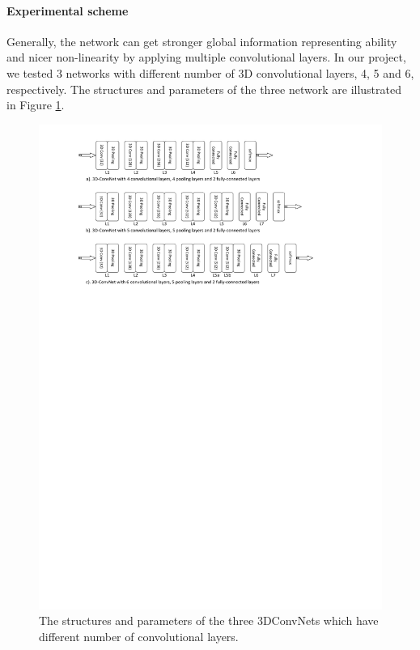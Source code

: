 \paragraph{Experimental scheme}
Generally, the network can get stronger global information representing ability and nicer non-linearity by applying multiple convolutional layers. In our project, we tested 3 networks with different number of 3D convolutional layers, 4, 5 and 6, respectively. The structures and parameters of the three network are illustrated in Figure \ref{fig:cnn_layers}.
\begin{figure}
 	\includegraphics[trim=1cm 20cm 0cm 1cm]{fig01/cnn_layers.pdf}
 	\caption{The structures and parameters of the three 3DConvNets which have different number of convolutional layers.}
 	\label{fig:cnn_layers}
\end{figure}
